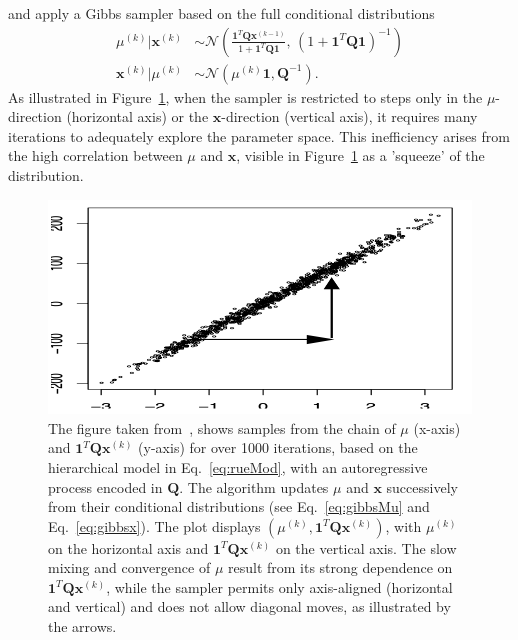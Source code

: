 and apply a Gibbs sampler based on the full conditional distributions
\begin{align}
	\mu^{(k)} | \bm{x}^{(k)} &\sim \mathcal{N} \left( \frac{\bm{1}^T \bm{Q} \bm{x}^{(k-1)}}{1 + \bm{1}^T \bm{Q} \bm{1}}, \, \left(1 + \bm{1}^T \bm{Q} \bm{1} \right)^{-1} \right) \label{eq:gibbsMu} \\
	\bm{x}^{(k)} | \mu^{(k)} &\sim \mathcal{N}(\mu^{(k)} \bm{1}, \bm{Q}^{-1})\label{eq:gibbsx}.
\end{align}
As illustrated in Figure~\ref{fig:RueHeld}, when the sampler is restricted to steps only in the $\mu$-direction (horizontal axis) or the $\bm{x}$-direction (vertical axis), it requires many iterations to adequately explore the parameter space. 
This inefficiency arises from the high correlation between $\mu$ and $\bm{x}$, visible in Figure~\ref{fig:RueHeld} as a 'squeeze' of the distribution.
\begin{figure}[ht!]
	\centering
	\includegraphics[width = \textwidth]{Figures/RueHeldBookFig.png}
	\caption[Correlation structure in between parameters and hyper-parameters]{The figure taken from~\cite[Figure 4.1 (b)]{rue2005gaussian}, shows samples from the chain of $\mu$ (x-axis) and $\bm{1}^T \bm{Q} \bm{x}^{(k)}$ (y-axis) for over 1000 iterations, based on the hierarchical model in Eq.~\ref{eq:rueMod}, with an autoregressive process encoded in $\bm{Q}$. The algorithm updates $\mu$ and $\bm{x}$ successively from their conditional distributions (see Eq.~\ref{eq:gibbsMu} and Eq.~\ref{eq:gibbsx}). The plot displays $(\mu^{(k)}, \bm{1}^T \bm{Q} \bm{x}^{(k)})$, with $\mu^{(k)}$ on the horizontal axis and $\bm{1}^T \bm{Q} \bm{x}^{(k)}$ on the vertical axis. The slow mixing and convergence of $\mu$ result from its strong dependence on $\bm{1}^T \bm{Q} \bm{x}^{(k)}$, while the sampler permits only axis-aligned (horizontal and vertical) and does not allow diagonal moves, as illustrated by the arrows.}
	\label{fig:RueHeld}
\end{figure}

